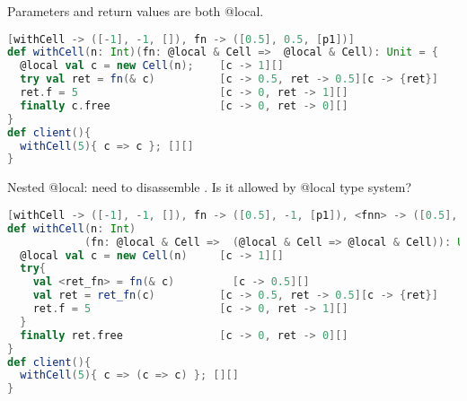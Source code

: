 
Parameters and return values are both @local.
\begin{lstlisting}[language=Scala,basicstyle=\footnotesize\ttfamily]
[withCell -> ([-1], -1, []), fn -> ([0.5], 0.5, [p1])]
def withCell(n: Int)(fn: @local & Cell =>  @local & Cell): Unit = {
  @local val c = new Cell(n);    [c -> 1][]
  try val ret = fn(& c)          [c -> 0.5, ret -> 0.5][c -> {ret}]
  ret.f = 5                      [c -> 0, ret -> 1][]
  finally c.free                 [c -> 0, ret -> 0][]  
}
def client(){
  withCell(5){ c => c }; [][]
}
\end{lstlisting}

Nested @local: need to disassemble . Is it allowed by @local type system?
\begin{lstlisting}[language=Scala,basicstyle=\footnotesize\ttfamily]
[withCell -> ([-1], -1, []), fn -> ([0.5], -1, [p1]), <fnn> -> ([0.5], 0.5, [p1])]
def withCell(n: Int)
            (fn: @local & Cell =>  (@local & Cell => @local & Cell)): Unit = {
  @local val c = new Cell(n)     [c -> 1][]
  try{ 
    val <ret_fn> = fn(& c)         [c -> 0.5][]  
    val ret = ret_fn(c)          [c -> 0.5, ret -> 0.5][c -> {ret}]  
    ret.f = 5                    [c -> 0, ret -> 1][]
  }
  finally ret.free               [c -> 0, ret -> 0][]  
}
def client(){
  withCell(5){ c => (c => c) }; [][]
}
\end{lstlisting}


